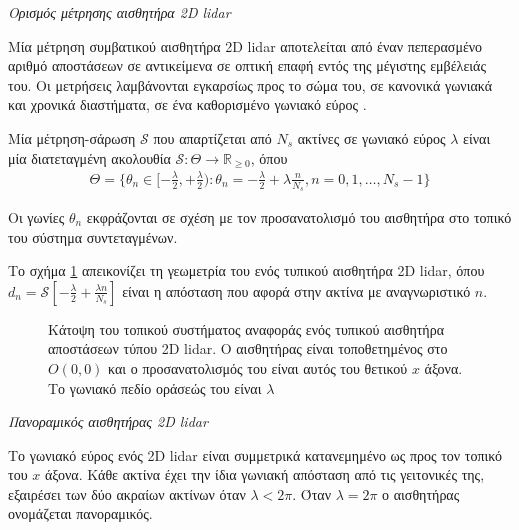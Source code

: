 \begin{bw_box}
\begin{definition}
  \label{def:lidar}
  \textit{Ορισμός μέτρησης αισθητήρα 2D lidar}

  Μία μέτρηση συμβατικού αισθητήρα 2D lidar αποτελείται από έναν πεπερασμένο
  αριθμό αποστάσεων σε αντικείμενα σε οπτική επαφή εντός της μέγιστης
  εμβέλειάς του. Οι μετρήσεις λαμβάνονται εγκαρσίως προς το σώμα του, σε
  κανονικά γωνιακά και χρονικά διαστήματα, σε ένα καθορισμένο γωνιακό εύρος
  \cite{Cooper2018a}.

  Μία μέτρηση-σάρωση $\mathcal{S}$ που απαρτίζεται από $N_s$ ακτίνες σε γωνιακό εύρος
  $\lambda$ είναι μία διατεταγμένη ακολουθία $\mathcal{S} : \Theta \rightarrow
  \mathbb{R}_{\geq 0}$, όπου
  \begin{align}
  \Theta = \{\theta_n \in [-\frac{\lambda}{2}, +\frac{\lambda}{2}) :
    \theta_n = -\frac{\lambda}{2} + \lambda \frac{n}{N_s},
  n = 0,1,\dots, N_s-1\}
  \end{align}

  Οι γωνίες $\theta_n$ εκφράζονται σε σχέση με τον προσανατολισμό του αισθητήρα
  στο τοπικό του σύστημα συντεταγμένων.
\end{definition}
\end{bw_box}

Το σχήμα \ref{fig:laser} απεικονίζει τη γεωμετρία του ενός τυπικού αισθητήρα
2D lidar, όπου $d_n = \mathcal{S}[-\frac{\lambda}{2} + \frac{\lambda n}{N_s}]$
είναι η απόσταση που αφορά στην ακτίνα με αναγνωριστικό $n$.

\begin{figure}[htbp]\centering
  
  \caption{\small Κάτοψη του τοπικού συστήματος αναφοράς ενός τυπικού αισθητήρα
           αποστάσεων τύπου 2D lidar. Ο αισθητήρας είναι τοποθετημένος στο
           $O(0,0)$ και ο προσανατολισμός του είναι αυτός του θετικού $x$
           άξονα. Το γωνιακό πεδίο οράσεώς του είναι $\lambda$}
  \label{fig:laser}
\end{figure}

\begin{bw_box}
\begin{definition}
  \textit{Πανοραμικός αισθητήρας 2D lidar}

  Το γωνιακό εύρος ενός 2D lidar είναι συμμετρικά κατανεμημένο ως προς τον
  τοπικό του $x$ άξονα. Κάθε ακτίνα έχει την ίδια γωνιακή απόσταση από τις
  γειτονικές της, εξαιρέσει των δύο ακραίων ακτίνων όταν $\lambda < 2\pi$.
  Όταν $\lambda = 2\pi$ ο αισθητήρας ονομάζεται πανοραμικός.
\end{definition}
\end{bw_box}



